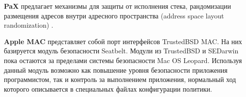 \bigskip
{\bfseries PaX} предлагает механизмы для защиты от исполнения стека, рандомизации размещения адресов внутри адресного пространства (address space layout randomization) . 

\bigskip
{\bfseries Apple MAC} представляет собой порт интерфейсов TrustedBSD MAC. На них базируется модуль безопасности Seatbelt. Модули из TrustedBSD и SEDarwin пока остаются за пределами системы безопасности Mac OS Leopard. Используя данный модуль возможно как повышение уровня безопасности приложения программистом, так и контроль за выполнением приложения, нормальный ход которого описывается в специальных файлах конфигурации политики.

